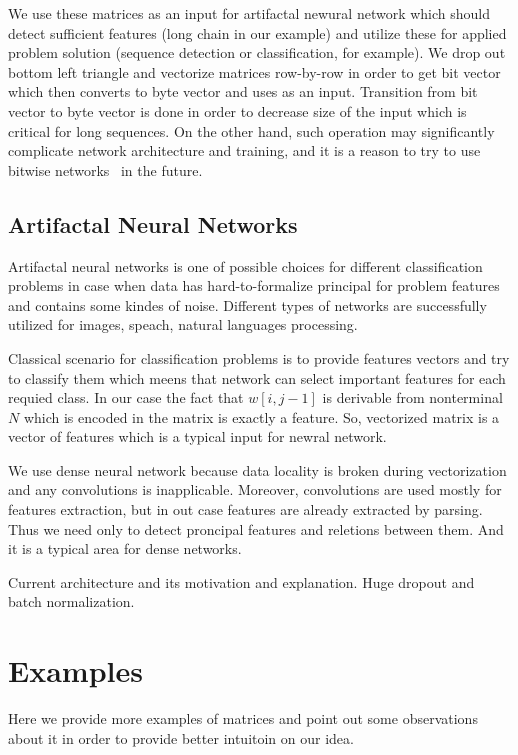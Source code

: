 \documentclass[a4paper,twoside]{article}
\begin{document}
We use these matrices as an input for artifactal newural network which should detect sufficient features (long chain in our example) and utilize these for applied problem solution (sequence detection or classification, for example).
We drop out bottom left triangle and vectorize matrices row-by-row in order to get bit vector which then converts to byte vector and uses as an input.
Transition from bit vector to byte vector is done in order to decrease size of the input which is critical for long sequences. 
On the other hand, such operation may significantly complicate network architecture and training, and it is a reason to try to use bitwise networks~\cite{DBLP:journals:corr:KimS16} in the future.  

\subsection{Artifactal Neural Networks}

\noindent Artifactal neural networks is one of possible choices for different classification problems in case when data has hard-to-formalize principal for problem features and contains some kindes of noise. Different types of networks are successfully utilized for images, speach, natural languages processing.

Classical scenario for classification problems is to provide features vectors and try to classify them which meens that network can select important features for each requied class.
In our case the fact that $w[i,j-1]$ is derivable from nonterminal $N$ which is encoded in the matrix is exactly a feature.
So, vectorized matrix is a vector of features which is a typical input for newral network.

We use dense neural network because data locality is broken during vectorization and any convolutions is inapplicable.
Moreover, convolutions are used mostly for features extraction, but in out case features are already extracted by parsing.
Thus we need only to detect proncipal features and reletions between them.
And it is a typical area for dense networks.

Current architecture and its motivation and explanation.
Huge dropout and batch normalization.

\section{Examples}
\label{sec:examples}

\noindent Here we provide more examples of matrices and point out some observations about it in order to provide better intuitoin on our idea.
\end{document}
